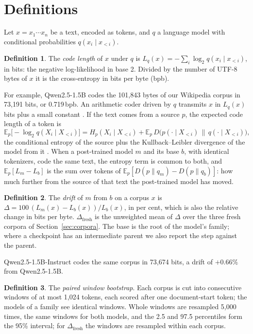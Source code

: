 \documentclass[11pt,a4paper]{article}
\theoremstyle{definition}
\newtheorem*{definition}{Definition}
\newcommand{\dfresh}{\Delta_{\mathrm{fresh}}}
\begin{document}
\section{Definitions}
\label{sec:definitions}

Let $x=x_1\cdots x_n$ be a text, encoded as tokens, and $q$ a language model with conditional probabilities
$q(x_i\mid x_{<i})$.

\begin{definition}
The \emph{code length} of $x$ under $q$ is $L_q(x)=-\sum_{i}\log_2 q(x_i\mid x_{<i})$, in bits: the negative
log-likelihood in base 2. Divided by the number of UTF-8 bytes of $x$ it is the cross-entropy in bits per byte
(bpb).
\end{definition}

\noindent For example, Qwen2.5-1.5B codes the 101,843 bytes of our Wikipedia corpus in 73,191 bits, or
0.719\,bpb. An arithmetic coder driven by $q$ transmits $x$ in $L_q(x)$ bits plus a small constant
\citep{deletang2024compression}. If the text comes from a source $p$, the expected code length of a token is
\begin{equation}
\mathbb{E}_p\bigl[-\log_2 q(X_i\mid X_{<i})\bigr]
 = H_p(X_i\mid X_{<i}) + \mathbb{E}_p\,D\bigl(p(\cdot\mid X_{<i})\,\big\|\,q(\cdot\mid X_{<i})\bigr),
\label{eq:identity}
\end{equation}
the conditional entropy of the source plus the Kullback--Leibler divergence of the model from it
\citep{shannon1948}. When a post-trained model $m$ and its base $b$, with identical tokenizers, code the same text,
the entropy term is common to both, and $\mathbb{E}_p[L_m-L_b]$ is the sum over tokens of
$\mathbb{E}_p[D(p\|q_m)-D(p\|q_b)]$: how much further from the source of that text the post-trained model has
moved.

\begin{definition}
The \emph{drift} of $m$ from $b$ on a corpus $x$ is $\Delta=100\,(L_m(x)-L_b(x))/L_b(x)$, in per cent, which is
also the relative change in bits per byte. $\dfresh$ is the unweighted mean of $\Delta$ over the three fresh
corpora of Section~\ref{sec:corpora}. The base is the root of the model's family; where a checkpoint has an
intermediate parent we also report the step against the parent.
\end{definition}

\noindent Qwen2.5-1.5B-Instruct codes the same corpus in 73,674 bits, a drift of $+0.66\%$ from Qwen2.5-1.5B.

\begin{definition}
The \emph{paired window bootstrap}. Each corpus is cut into consecutive windows of at most 1,024 tokens, each
scored after one document-start token; the models of a family see identical windows. Whole windows are resampled
5,000 times, the same windows for both models, and the 2.5 and 97.5 percentiles form the 95\% interval; for
$\dfresh$ the windows are resampled within each corpus.
\end{definition}
\end{document}
